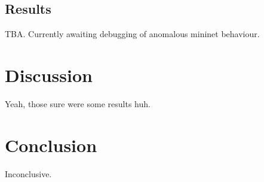\documentclass[10pt, a4paper]{article}
\begin{document}
\subsection{Results}

TBA. Currently awaiting debugging of anomalous mininet behaviour.

\section{Discussion}

Yeah, those sure were some results huh.

\section{Conclusion}

Inconclusive.

\printbibliography
\end{document}
